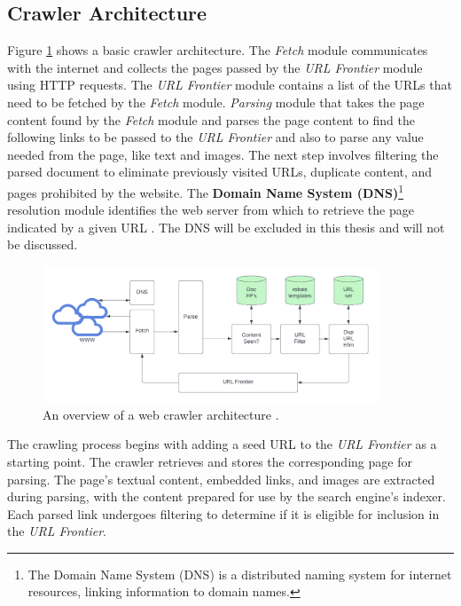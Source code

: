 \subsection{Crawler Architecture}

Figure \ref{fig:web-crawler-arch} shows a basic crawler architecture. The \textit{Fetch} module communicates with the internet and collects the pages passed by the \textit{URL Frontier} module using HTTP requests. The \textit{URL Frontier} module contains a list of the URLs that need to be fetched by the \textit{Fetch} module. \textit{Parsing} module that takes the page content found by the \textit{Fetch} module and parses the page content to find the following links to be passed to the \textit{URL Frontier} and also to parse any value needed from the page, like text and images. The next step involves filtering the parsed document to eliminate previously visited URLs, duplicate content, and pages prohibited by the website. The \textbf{Domain Name System (DNS)}\footnote{The Domain Name System (DNS) is a distributed naming system for internet resources, linking information to domain names.} resolution module identifies the web server from which to retrieve the page indicated by a given URL \cite{manning2008}. The DNS will be excluded in this thesis and will not be discussed. 

\begin{figure}[h]	
     \centering
     \includegraphics[width=10cm]{figures/crawler_architecture.png}
     \caption{An overview of a web crawler architecture \cite{manning2008}.}
     \label{fig:web-crawler-arch}
\end{figure}

The crawling process begins with adding a seed URL to the \textit{URL Frontier} as a starting point. The crawler retrieves and stores the corresponding page for parsing. The page's textual content, embedded links, and images are extracted during parsing, with the content prepared for use by the search engine's indexer. Each parsed link undergoes filtering to determine if it is eligible for inclusion in the \textit{URL Frontier}.

